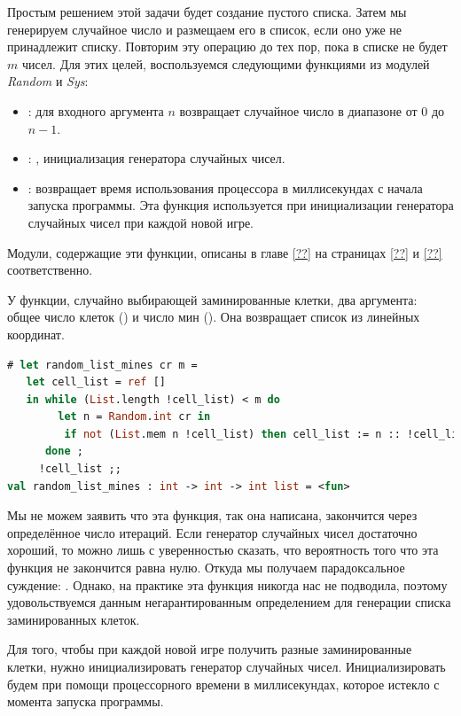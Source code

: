 Простым решением этой задачи будет создание пустого списка. Затем мы генерируем 
случайное число и размещаем его в список, если оно уже не принадлежит списку. 
Повторим эту операцию до тех пор, пока в списке не будет $m$ чисел. Для этих 
целей, воспользуемся следующими функциями из модулей {\it Random} и {\it Sys}:

\begin{itemize}
	\item {}:  для входного аргумента $n$ 
возвращает случайное число в диапазоне от $0$ до $n - 1$. 

	\item {}: , инициализация генератора 
случайных чисел.

	\item {}:  возвращает время использования 
процессора в миллисекундах с начала запуска программы. Эта функция используется 
при инициализации генератора случайных чисел при каждой новой игре. 
\end{itemize}

Модули, содержащие эти функции, описаны в главе  \ref{??} на страницах \ref{??} 
и \ref{??} соответственно.

У функции, случайно выбирающей заминированные клетки, два аргумента: общее число 
клеток () и число мин (). Она возвращает список из  
линейных координат. 

\begin{lstlisting}[language=OCaml]
# let random_list_mines cr m = 
   let cell_list = ref [] 
   in while (List.length !cell_list) < m do 
        let n = Random.int cr in
         if not (List.mem n !cell_list) then cell_list := n :: !cell_list 
      done ;
     !cell_list ;;
val random_list_mines : int -> int -> int list = <fun>
\end{lstlisting}

Мы не можем заявить что эта функция, так она написана, закончится через 
определённое число итераций. Если генератор случайных чисел достаточно хороший, 
то можно лишь с уверенностью сказать, что вероятность того что эта функция не 
закончится равна нулю. Откуда мы получаем парадоксальное суждение: . Однако, на практике эта функция 
никогда нас не подводила, поэтому удовольствуемся данным негарантированным 
определением для генерации списка заминированных клеток.

Для того, чтобы при каждой новой игре получить разные заминированные клетки, 
нужно инициализировать генератор случайных чисел. Инициализировать будем при 
помощи процессорного времени в миллисекундах, которое истекло с момента запуска 
программы.

